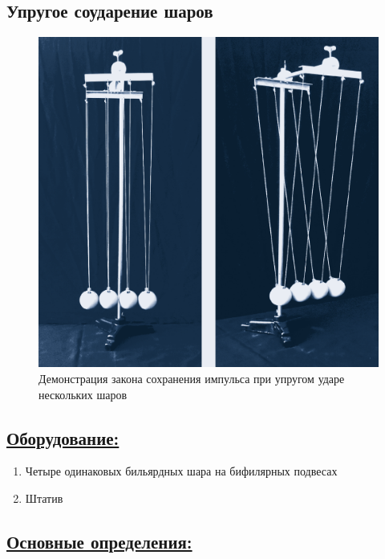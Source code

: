 \documentclass[14pt,a4paper,oneside]{extarticle}	%
\begin{document}


\begin{center}
	\subsection*{Упругое соударение шаров}
\end{center}

\begin{figure}[H]
	\centering 	
	\includegraphics[width=0.75\linewidth]{impact-1.png}
	\caption{Демонстрация закона сохранения импульса при упругом ударе нескольких шаров}
	\label{impact-1}
\end{figure}

\subsection*{\underline{Оборудование:}}

\begin{enumerate}
	\item Четыре одинаковых бильярдных шара на бифилярных подвесах
	\item Штатив
\end{enumerate}

\newpage
\subsection*{\underline{Основные определения:}}
\end{document}
